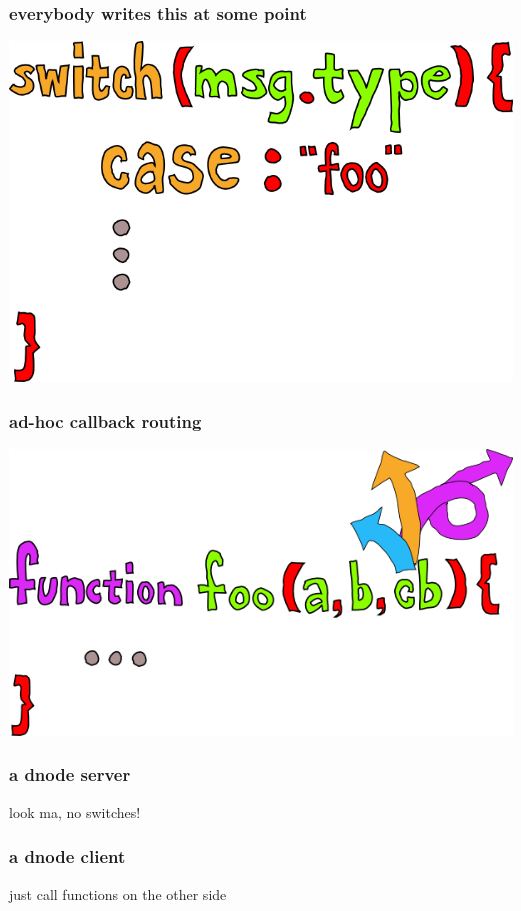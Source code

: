 \documentclass{beamer}
\begin{document}
\begin{frame}
    \frametitle{everybody writes this at some point}
    \includegraphics[scale=0.6]{images/switch.png}
\end{frame}

\begin{frame}
    \frametitle{ad-hoc callback routing}
    \includegraphics[scale=0.4]{images/fn.png}
\end{frame}

\begin{frame}
    \frametitle{a dnode server}
    
    \huge
    look ma, no switches!
    \newline
    
    \normalsize
    \fbox{}
\end{frame}

\begin{frame}
    \frametitle{a dnode client}
    
    \huge
    just call functions on the other side
    \newline
    
    \normalsize
    \fbox{
        
    }
\end{frame}
\end{document}
